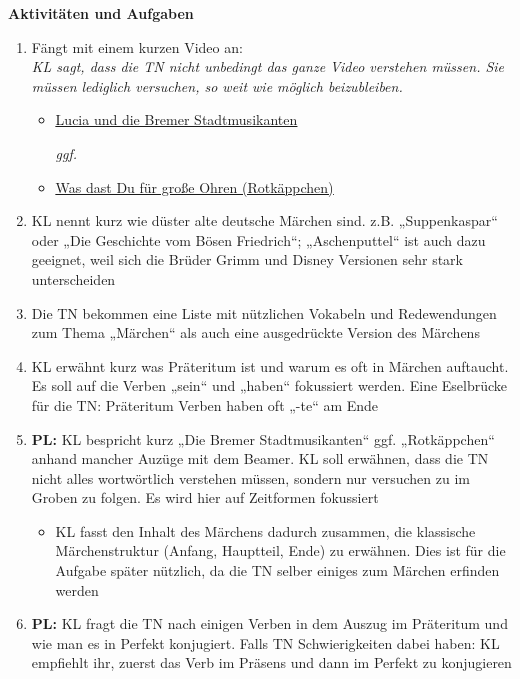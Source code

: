 \documentclass[12pt,a4paper]{article}
\newcommand{\ulhref}[2]{\href{#1}{\uline{#2}}}
\begin{document}
\large{\textbf{Aktivitäten und Aufgaben}}
\begin{enumerate}

    \item Fängt mit einem kurzen Video an: 
        \\\textit{KL sagt, dass die TN nicht unbedingt das ganze Video verstehen müssen. Sie müssen lediglich versuchen, so weit wie möglich beizubleiben.}
        \begin{itemize}
            \item \ulhref{https://youtu.be/JvDe3JtK6wI}{Lucia und die Bremer Stadtmusikanten} \par
            \textit{ggf.}
            \item \ulhref{https://youtu.be/eQvFp4ZD4Hc?list=RDeQvFp4ZD4Hc}{Was dast Du für große Ohren (Rotkäppchen)}
        \end{itemize}

    \item KL nennt kurz wie düster alte deutsche Märchen sind. z.B. „Suppenkaspar“ oder „Die Geschichte vom Bösen Friedrich“; „Aschenputtel“ ist auch dazu geeignet, weil sich die Brüder Grimm und Disney Versionen sehr stark unterscheiden

    \item Die TN bekommen eine Liste mit nützlichen Vokabeln und Redewendungen zum Thema „Märchen“ als auch eine ausgedrückte Version des Märchens   

    \item KL erwähnt kurz was Präteritum ist und warum es oft in Märchen auftaucht. Es soll auf die Verben „sein“ und „haben“ fokussiert werden. Eine Eselbrücke für die TN: Präteritum Verben haben oft „-te“ am Ende

    \item \textbf{PL:} KL bespricht kurz „Die Bremer Stadtmusikanten“ ggf. „Rotkäppchen“ anhand mancher Auzüge mit dem Beamer. KL soll erwähnen, dass die TN nicht alles wortwörtlich verstehen müssen, sondern nur versuchen zu im Groben zu folgen. Es wird hier auf Zeitformen fokussiert
        \begin{itemize}
            \item KL fasst den Inhalt des Märchens dadurch zusammen, die klassische Märchenstruktur (Anfang, Hauptteil, Ende) zu erwähnen. Dies ist für die Aufgabe später nützlich, da die TN selber einiges zum Märchen erfinden werden
        \end{itemize}

    \item \textbf{PL:} KL fragt die TN nach einigen Verben in dem Auszug im Präteritum und wie man es in Perfekt konjugiert. Falls TN Schwierigkeiten dabei haben: KL empfiehlt ihr, zuerst das Verb im Präsens und dann im Perfekt zu konjugieren


\end{enumerate}
\end{document}
